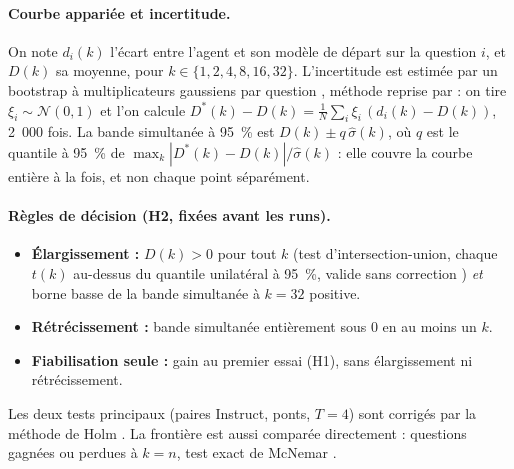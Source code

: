 \paragraph{Courbe appariée et incertitude.} On note $d_i(k)$ l'écart entre l'agent et son modèle de départ sur la question $i$, et $D(k)$ sa moyenne, pour $k \in \{1, 2, 4, 8, 16, 32\}$. L'incertitude est estimée par un bootstrap à multiplicateurs gaussiens par question \citep{chernozhukov2013gaussian}, méthode reprise par \citet{yang2026crossovers} : on tire $\xi_i \sim \mathcal{N}(0,1)$ et l'on calcule $D^*(k) - D(k) = \frac{1}{N}\sum_i \xi_i \,(d_i(k) - D(k))$, 2~000 fois. La bande simultanée à 95~\% est $D(k) \pm q\,\hat\sigma(k)$, où $q$ est le quantile à 95~\% de $\max_k |D^*(k) - D(k)|/\hat\sigma(k)$ : elle couvre la courbe entière à la fois, et non chaque point séparément.

\paragraph{Règles de décision (H2, fixées avant les runs).}
\begin{itemize}
\item \textbf{Élargissement :} $D(k) > 0$ pour tout $k$ (test d'intersection-union, chaque $t(k)$ au-dessus du quantile unilatéral à 95~\%, valide sans correction \citep{berger1982multiparameter}) \emph{et} borne basse de la bande simultanée à $k = 32$ positive.
\item \textbf{Rétrécissement :} bande simultanée entièrement sous 0 en au moins un $k$.
\item \textbf{Fiabilisation seule :} gain au premier essai (H1), sans élargissement ni rétrécissement.
\end{itemize}
Les deux tests principaux (paires Instruct, ponts, $T = 4$) sont corrigés par la méthode de Holm \citep{holm1979simple}. La frontière est aussi comparée directement : questions gagnées ou perdues à $k = n$, test exact de McNemar \citep{mcnemar1947note}.

